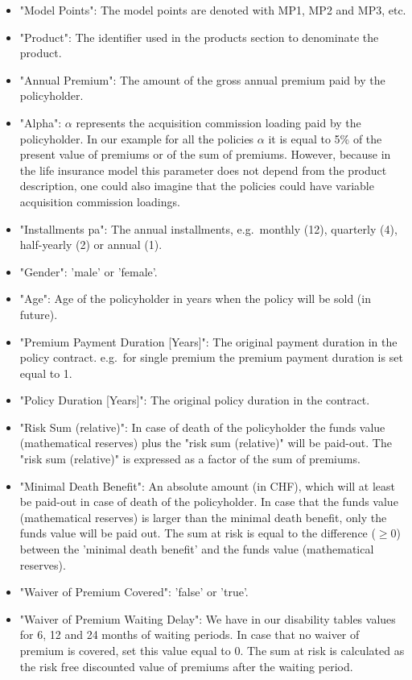 \begin{itemize}
	\item	"Model Points": The model points are denoted with MP1, MP2 and MP3, etc.
	\item	"Product": The identifier used in the products section to denominate the product.
	\item	"Annual Premium": The amount of the gross annual premium paid by the policyholder.
	\item	"Alpha": $\alpha$ represents the acquisition commission loading paid by the policyholder. In our example for all the policies $\alpha$ it is equal to 5\% of the present value of premiums or of the sum of premiums. However, because in the life insurance model this parameter does not depend from the product description, one could also imagine that the policies could have variable acquisition commission loadings.
	\item	"Installments pa": The annual installments, e.g.~monthly (12), quarterly (4), half-yearly (2) or annual (1).
	\item	"Gender": 'male' or 'female'.
	\item	"Age": Age of the policyholder in years when the policy will be sold (in future).
	\item	"Premium Payment Duration [Years]": The original payment duration in the policy contract. e.g.~for single premium the premium payment duration is set equal to 1.
	\item	"Policy Duration [Years]": The original policy duration in the contract.
	\item	"Risk Sum (relative)": In case of death of the policyholder the funds value (mathematical reserves) plus the "risk sum (relative)" will be paid-out. The "risk sum (relative)" is expressed as a factor of the sum of premiums.
	\item	"Minimal Death Benefit": An absolute amount (in CHF), which will at least be paid-out in case of death of the policyholder. In case that the funds value (mathematical reserves) is larger than the minimal death benefit, only the funds value will be paid out. The sum at risk is equal to the difference ($\geq 0$) between the 'minimal death benefit' and the funds value (mathematical reserves).
	\item	"Waiver of Premium Covered": 'false' or 'true'.
	\item	"Waiver of Premium Waiting Delay": We have in our disability tables values for 6, 12 and 24 months of waiting periods. In case that no waiver of premium is covered, set this value equal to 0. The sum at risk is calculated as the risk free discounted value of premiums after the waiting period.
\end{itemize}

